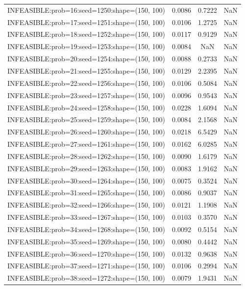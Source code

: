 \begin{longtable}{lccc}
INFEASIBLE:prob=16:seed=1250:shape=(150, 100)  & 0.0086 &  0.7222 &    NaN \\
INFEASIBLE:prob=17:seed=1251:shape=(150, 100)  & 0.0106 &  1.2725 &    NaN \\
INFEASIBLE:prob=18:seed=1252:shape=(150, 100)  & 0.0117 &  0.9129 &    NaN \\
INFEASIBLE:prob=19:seed=1253:shape=(150, 100)  & 0.0084 &     NaN &    NaN \\
INFEASIBLE:prob=20:seed=1254:shape=(150, 100)  & 0.0088 &  0.2733 &    NaN \\
INFEASIBLE:prob=21:seed=1255:shape=(150, 100)  & 0.0129 &  2.2395 &    NaN \\
INFEASIBLE:prob=22:seed=1256:shape=(150, 100)  & 0.0106 &  0.5084 &    NaN \\
INFEASIBLE:prob=23:seed=1257:shape=(150, 100)  & 0.0096 &  0.9543 &    NaN \\
INFEASIBLE:prob=24:seed=1258:shape=(150, 100)  & 0.0228 &  1.6094 &    NaN \\
INFEASIBLE:prob=25:seed=1259:shape=(150, 100)  & 0.0084 &  2.1568 &    NaN \\
INFEASIBLE:prob=26:seed=1260:shape=(150, 100)  & 0.0218 &  6.5429 &    NaN \\
INFEASIBLE:prob=27:seed=1261:shape=(150, 100)  & 0.0162 &  6.0285 &    NaN \\
INFEASIBLE:prob=28:seed=1262:shape=(150, 100)  & 0.0090 &  1.6179 &    NaN \\
INFEASIBLE:prob=29:seed=1263:shape=(150, 100)  & 0.0083 &  1.9162 &    NaN \\
INFEASIBLE:prob=30:seed=1264:shape=(150, 100)  & 0.0075 &  0.3524 &    NaN \\
INFEASIBLE:prob=31:seed=1265:shape=(150, 100)  & 0.0086 &  0.9037 &    NaN \\
INFEASIBLE:prob=32:seed=1266:shape=(150, 100)  & 0.0121 &  1.1908 &    NaN \\
INFEASIBLE:prob=33:seed=1267:shape=(150, 100)  & 0.0103 &  0.3570 &    NaN \\
INFEASIBLE:prob=34:seed=1268:shape=(150, 100)  & 0.0092 &  0.5154 &    NaN \\
INFEASIBLE:prob=35:seed=1269:shape=(150, 100)  & 0.0080 &  0.4442 &    NaN \\
INFEASIBLE:prob=36:seed=1270:shape=(150, 100)  & 0.0132 &  0.9638 &    NaN \\
INFEASIBLE:prob=37:seed=1271:shape=(150, 100)  & 0.0106 &  0.2994 &    NaN \\
INFEASIBLE:prob=38:seed=1272:shape=(150, 100)  & 0.0079 &  1.9431 &    NaN \\

\end{longtable}
